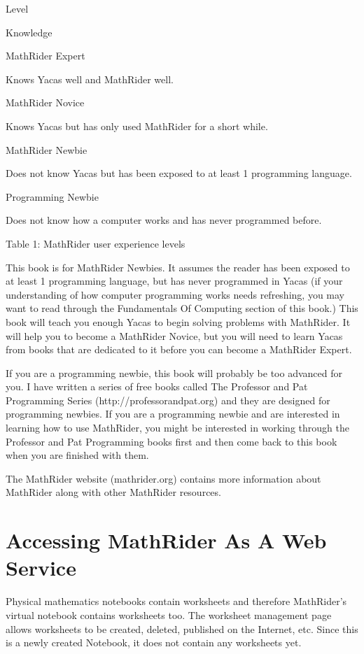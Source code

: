 \documentclass[12pt,oneside]{book}
\begin{document}
Level

Knowledge

MathRider Expert

Knows Yacas well and MathRider well.

MathRider Novice

Knows Yacas but has only used MathRider for a short while.

MathRider Newbie

Does not know Yacas but has been exposed to at least 1 programming
language.

Programming Newbie

Does not know how a computer works and has never programmed before.

Table 1: MathRider user experience levels


This book is for MathRider Newbies. It assumes the reader has been exposed to at least 1 programming language, but has never programmed in Yacas (if your understanding of how computer programming works needs refreshing, you may want to read through the Fundamentals Of Computing section of this book.) This book will teach you enough Yacas to begin solving problems with MathRider. It will help you to become a MathRider Novice, but you will need to learn Yacas from books that are dedicated to it before you can become a MathRider Expert.  

If you are a programming newbie, this book will probably be too advanced for you. I have written a series of free books called The Professor and Pat Programming Series (http://professorandpat.org) and they are designed for programming newbies. If you are a programming newbie and are interested in learning how to use MathRider, you might be interested in working through the Professor and Pat Programming books first and then come back to this book when you are finished with them. 


The MathRider website (mathrider.org) contains more information about MathRider along with other MathRider resources.

\section[Accessing MathRider As A Web Service]{Accessing MathRider As A Web Service}
Physical mathematics notebooks contain worksheets and therefore MathRider's virtual notebook contains worksheets too. The worksheet management page allows worksheets to be created, deleted, published on the Internet, etc. Since this is a newly created Notebook, it does not contain any worksheets yet.  
\end{document}
